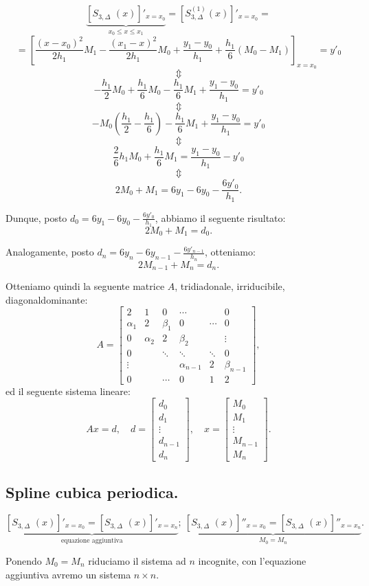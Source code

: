 \[
\underbrace{\left[S_{3,\Delta}^{\phantom{(1)}}(x) \right]'_{x = x_0}}
_{ x_0 \leq x \leq x_1} = \left[S_{3,\Delta}^{(1)}(x) \right]'_{x = x_0} =
\]
\[=
\left[
\frac{(x-x_{0})^2}{2h_1}M_1 
- \frac{(x_1-x)^2}{2h_1}M_{0} + \frac{y_{1} -y_{0}}{h_1} + 
\frac{h_1}{6}\left(M_{0}-M_1\right) \right]_{x = x_0}
= y'_0 
\]
\[\Updownarrow\]
\[
- \frac{h_1}{2}M_0 + \frac{h_1}{6}M_0 - \frac{h_1}{6}M_1 
+ \frac{y_{1} -y_{0}}{h_1} = y'_0 
\]
\[\Updownarrow\]
\[
- M_0\left(\frac{h_1}{2}-\frac{h_1}{6} \right) - \frac{h_1}{6}M_1 
+ \frac{y_{1} -y_{0}}{h_1} = y'_0 
\]
\[\Updownarrow\]
\[
\frac{2}{6}h_1M_0 + \frac{h_1}{6}M_1  = \frac{y_{1} -y_{0}}{h_1} -y'_0 
\]
\[\Updownarrow\]
\[
2 M_0 + M_1 = 6y_1 -6y_0 - \frac{6 y'_0}{h_1}.
\]

Dunque, posto $d_0 = 6y_1 -6y_0 - \frac{6 y'_0}{h_1}$, abbiamo il seguente
risultato:
\[2 M_0 + M_1 = d_0.
\]

Analogamente, posto $d_n = 6y_{n} - 6y_{n-1} - \frac{6 y'_{n-1}}{h_n}$, 
otteniamo:
\[2 M_{n-1} + M_n = d_n.\]

Otteniamo quindi la seguente matrice $A$, tridiadonale, irriducibile,
diagonaldominante:
\[A =
\left[
\begin{array}{cccccc}
2 & 1 & 0 & \cdots & &0 \\
\alpha_1&  2 & \beta_1 & 0  &\cdots & 0 \\
0 &\alpha_2 & 2 & \beta_2 & & \vdots \\
0  & &\ddots &\ddots &\ddots &  0\\
\vdots & & &\alpha_{n-1} & 2& \beta_{n-1}\\
0 & & \cdots & 0 &1 & 2
\end{array}
\right],
\]
ed il seguente sistema lineare:
\[
Ax = d, \quad d = \left[\begin{array}{c}
d_0 \\
d_1 \\
\vdots \\
d_{n-1} \\
d_n
\end{array}
\right], \quad 
x = \left[\begin{array}{c}
M_0 \\
M_1 \\
\vdots \\
M_{n-1} \\
M_n
\end{array}
\right].
\]

\subsection{Spline cubica periodica.}

\[
\underbrace{\left[S_{3,\Delta}^{\phantom{(1)}}(x) \right]'_{x = x_0}
=\left[S_{3,\Delta}^{\phantom{(1)}}(x) \right]'_{x = x_n}}_{\textrm{equazione aggiuntiva}};
\ \underbrace{\left[S_{3,\Delta}^{\phantom{(1)}}(x) \right]''_{x = x_0}
=\left[S_{3,\Delta}^{\phantom{(1)}}(x) \right]''_{x = x_n}}_{M_0 = M_n}.
\]

Ponendo $M_0 = M_n$ riduciamo il sistema ad $n$ incognite, con l'equazione
aggiuntiva avremo un sistema $n \times n$.
